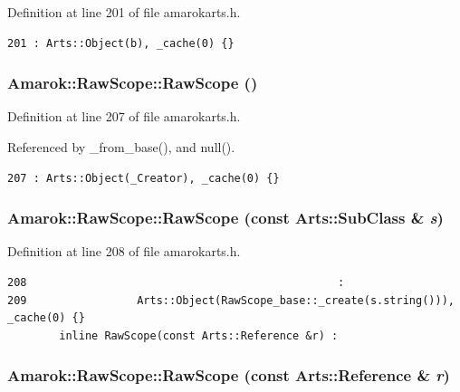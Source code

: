 Definition at line 201 of file amarokarts.h.



\footnotesize\begin{verbatim}201 : Arts::Object(b), _cache(0) {}
\end{verbatim}\normalsize 
{}
\subsubsection{\setlength{\rightskip}{0pt plus 5cm}Amarok::Raw\-Scope::Raw\-Scope ()\hspace{0.3cm}{\tt  [inline]}}\label{classAmarok_1_1RawScope_Amarok_1_1RawScopea0}




Definition at line 207 of file amarokarts.h.

Referenced by \_\-from\_\-base(), and null().



\footnotesize\begin{verbatim}207 : Arts::Object(_Creator), _cache(0) {}
\end{verbatim}\normalsize 
{}
\subsubsection{\setlength{\rightskip}{0pt plus 5cm}Amarok::Raw\-Scope::Raw\-Scope (const Arts::Sub\-Class \& {\em s})\hspace{0.3cm}{\tt  [inline]}}\label{classAmarok_1_1RawScope_Amarok_1_1RawScopea1}




Definition at line 208 of file amarokarts.h.



\footnotesize\begin{verbatim}208                                                :
209                 Arts::Object(RawScope_base::_create(s.string())), _cache(0) {}
        inline RawScope(const Arts::Reference &r) :
\end{verbatim}\normalsize 
{}
\subsubsection{\setlength{\rightskip}{0pt plus 5cm}Amarok::Raw\-Scope::Raw\-Scope (const Arts::Reference \& {\em r})\hspace{0.3cm}{\tt  [inline]}}\label{classAmarok_1_1RawScope_Amarok_1_1RawScopea2}




